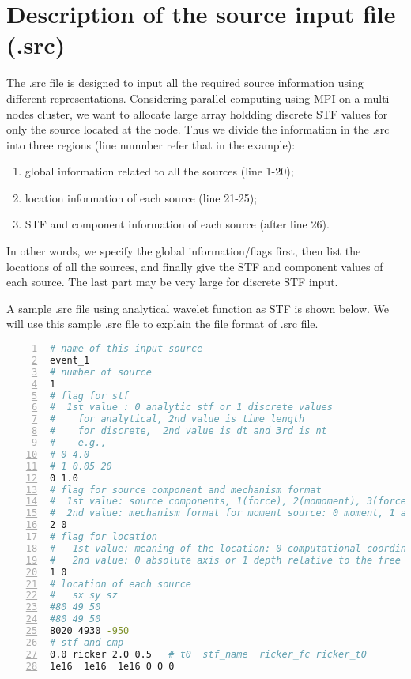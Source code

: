 \section{Description of the source input file (.src)} \label{src_format}

The .src file is designed to input all the required source information using different representations.
Considering parallel computing using MPI on a multi-nodes cluster, we want to allocate
large array holdding discrete STF values for only the source located at the node.
Thus we divide the information in the .src into three regions (line numnber refer that in the example):
\begin{enumerate}
    \item global information related to all the sources (line 1-20);
    \item location information of each source (line 21-25);
    \item STF and component information of each source (after line 26).
\end{enumerate}
In other words, we specify the global information/flags first,
 then list the locations of all the sources,
 and finally give the STF and component values of each source.
 The last part may be very large for discrete STF input.

A sample .src file using analytical wavelet function as STF is shown below.
 We will use this sample .src file to explain the file format of .src file.
\begin{lstlisting}[language=bash, caption=Source input file using analytical wavelet,
   numbers=left, numbersep=5pt,numberstyle=\tiny\color{codegray}, commentstyle=\color{codegreen},
   frame=tb]
# name of this input source
event_1
# number of source
1
# flag for stf
#  1st value : 0 analytic stf or 1 discrete values
#    for analytical, 2nd value is time length
#    for discrete,  2nd value is dt and 3rd is nt
#    e.g.,
# 0 4.0 
# 1 0.05 20
0 1.0
# flag for source component and mechanism format
#  1st value: source components, 1(force), 2(momoment), 3(force+moment)
#  2nd value: mechanism format for moment source: 0 moment, 1 angle + mu + D + A
2 0
# flag for location
#   1st value: meaning of the location: 0 computational coordinate, 1 physical coordinate
#   2nd value: 0 absolute axis or 1 depth relative to the free surface of the third coordinate
1 0
# location of each source
#   sx sy sz
#80 49 50
#80 49 50
8020 4930 -950
# stf and cmp
0.0 ricker 2.0 0.5   # t0  stf_name  ricker_fc ricker_t0
1e16  1e16  1e16 0 0 0 
\end{lstlisting}


